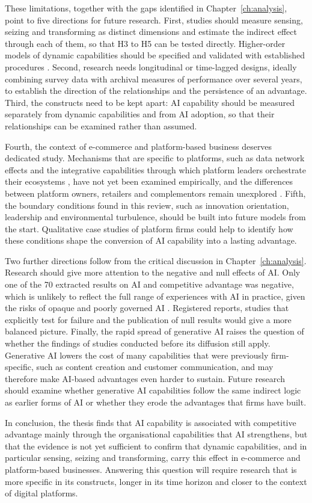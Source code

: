 These limitations, together with the gaps identified in Chapter~\ref{ch:analysis}, point to five directions for future research. First, studies should measure sensing, seizing and transforming as distinct dimensions and estimate the indirect effect through each of them, so that H3 to H5 can be tested directly. Higher-order models of dynamic capabilities should be specified and validated with established procedures \parencite{sarstedt2019}. Second, research needs longitudinal or time-lagged designs, ideally combining survey data with archival measures of performance over several years, to establish the direction of the relationships and the persistence of an advantage. Third, the constructs need to be kept apart: AI capability should be measured separately from dynamic capabilities and from AI adoption, so that their relationships can be examined rather than assumed.

Fourth, the context of e-commerce and platform-based business deserves dedicated study. Mechanisms that are specific to platforms, such as data network effects \parencite{gregory2021} and the integrative capabilities through which platform leaders orchestrate their ecosystems \parencite{helfat2018}, have not yet been examined empirically, and the differences between platform owners, retailers and complementors remain unexplored \parencite{cennamo2021}. Fifth, the boundary conditions found in this review, such as innovation orientation, leadership and environmental turbulence, should be built into future models from the start. Qualitative case studies of platform firms could help to identify how these conditions shape the conversion of AI capability into a lasting advantage.

Two further directions follow from the critical discussion in Chapter~\ref{ch:analysis}. Research should give more attention to the negative and null effects of AI. Only one of the 70 extracted results on AI and competitive advantage was negative, which is unlikely to reflect the full range of experiences with AI in practice, given the risks of opaque and poorly governed AI \parencite{rana2022}. Registered reports, studies that explicitly test for failure and the publication of null results would give a more balanced picture. Finally, the rapid spread of generative AI raises the question of whether the findings of studies conducted before its diffusion still apply. Generative AI lowers the cost of many capabilities that were previously firm-specific, such as content creation and customer communication, and may therefore make AI-based advantages even harder to sustain. Future research should examine whether generative AI capabilities follow the same indirect logic as earlier forms of AI or whether they erode the advantages that firms have built.

In conclusion, the thesis finds that AI capability is associated with competitive advantage mainly through the organisational capabilities that AI strengthens, but that the evidence is not yet sufficient to confirm that dynamic capabilities, and in particular sensing, seizing and transforming, carry this effect in e-commerce and platform-based businesses. Answering this question will require research that is more specific in its constructs, longer in its time horizon and closer to the context of digital platforms.
